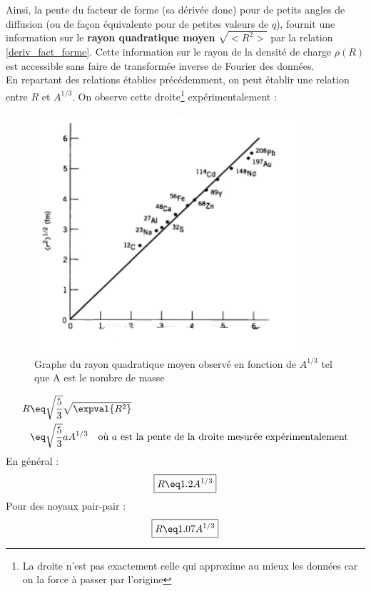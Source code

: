 Ainsi, la pente du facteur de forme (sa dérivée donc) pour de petits angles de diffusion (ou de façon équivalente pour de petites valeurs de $q$), fournit une information sur le \textbf{rayon quadratique moyen} $\sqrt{<R^2>}$ par la relation \ref{deriv_fact_forme}. Cette information sur le rayon de la densité de charge $\rho(R)$ est accessible sans faire de transformée inverse de Fourier des données.\\
En repartant des relations établies précédemment, on peut établir une relation entre $R$ et $A^{1/3}$. On observe cette droite\footnote{La droite n'est pas exactement celle qui approxime au mieux les données car on la force à passer par l'origine} expérimentalement :
\begin{figure}[H]
    \centering
    \includegraphics[scale=1.2]{Images4/DroiteAR.PNG}
    \caption{Graphe du rayon quadratique moyen observé en fonction de $A^{1/3}$ tel que A est le nombre de masse}
\end{figure}
\begin{align*}
    R &\eq \sqrt{\frac{5}{3}} \sqrt{\expval{R^2}}\\
    &\eq \sqrt{\frac{5}{3}} aA^{1/3} \quad \text{où $a$ est la pente de la droite mesurée expérimentalement}
\end{align*}
En général :
\begin{equation*}
    \boxed{
        R \eq 1.2 A^{1/3}
    }
\end{equation*}
Pour des noyaux pair-pair :
\begin{equation*}
    \boxed{
        R \eq 1.07 A^{1/3}
    }
\end{equation*}








